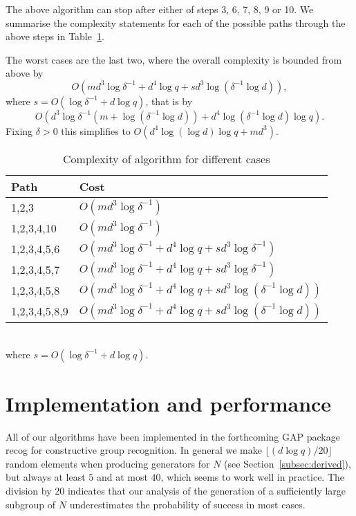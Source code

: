 The above algorithm can stop after either of steps 3, 6, 7, 8, 9 or 10.
We summarise the complexity statements for each of the possible paths
through the above steps in Table~\ref{casescomplexity}.

The worst cases are the last two, where the overall complexity is
bounded from above by
\[ O(md^3 \log \delta^{-1} +d^4\log q
              + sd^3 \log( \delta^{-1} \log d)), \]
where $s = O(\log \delta^{-1} + d\log q)$, that is by
\[ O(d^3\log \delta^{-1}(m + \log( \delta^{-1} \log d))
              + d^4 \log( \delta^{-1} \log d) \log q). \]
Fixing $\delta > 0$ this simplifies to $O(d^4 \log (\log d) \log q + md^3)$. 
\begin{table}
\begin{center}
\begin{tabular}{|l|l|}
\hline
Path & Cost \\
\hline
\hline
1,2,3 & $O(md^3 \log \delta^{-1} )$ \\
1,2,3,4,10 & $O(md^3 \log \delta^{-1} )$ \\
1,2,3,4,5,6 & $O(md^3 \log \delta^{-1}  +d^4\log q
              + sd^3\log \delta^{-1})$ \\
1,2,3,4,5,7 & $O(md^3 \log \delta^{-1} +d^4\log q + sd^3 \log \delta^{-1})$ \\
1,2,3,4,5,8 & $O(md^3 \log \delta^{-1} +d^4\log q
              + sd^3\log(\delta^{-1} \log d))$ \\
1,2,3,4,5,8,9 & $O(md^3 \log \delta^{-1}  +d^4\log q
              + sd^3\log(\delta^{-1} \log d))$ \\
\hline
\end{tabular}
\\[3mm]
where $s = O(\log \delta^{-1} + d\log q)$.
\end{center}
\caption{Complexity of algorithm for different cases}
\label{casescomplexity}
\end{table}

\section{Implementation and performance}
\label{implcomplexity}

All of our algorithms have been implemented in the
forthcoming \textsf{GAP} package \textsf{recog} for constructive group 
%
recognition. In general 
we make $\lfloor (d\log q)/20 \rfloor$
random elements when producing generators for $N$ (see
Section~\ref{subsec:derived}), but always at least $5$ and 
at most $40$, which seems
to work well in practice. The division by $20$ 
indicates that our analysis of the generation of a
sufficiently large subgroup of $N$ underestimates the probability of success in
most cases.

